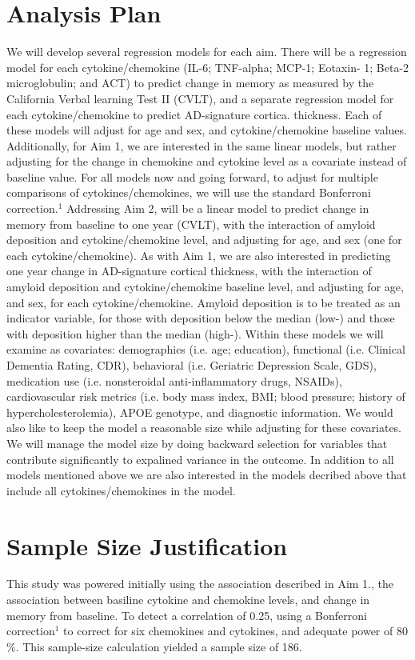 \documentclass[
]{article}
\begin{document}
\begin{doublespace}
\section{Analysis Plan}
We will develop several regression models for each aim. There will be a
regression model for each cytokine/chemokine (IL-6; TNF-alpha; MCP-1; Eotaxin-
1; Beta-2 microglobulin; and ACT) to predict change in memory as measured by the California Verbal learning Test II (CVLT),
and a separate regression model for each cytokine/chemokine to predict AD-signature cortica. thickness. Each of these
models will adjust for age and sex, and cytokine/chemokine baseline values.
Additionally, for Aim 1, we are
interested in the same linear models, but rather adjusting for the
change in chemokine and cytokine level as a covariate instead of
baseline value. For all models now and going forward, to adjust for multiple
comparisons of cytokines/chemokines, we will use the standard Bonferroni correction.\(^1\) Addressing Aim 2, will be a
linear model to predict change in memory from baseline to one year (CVLT),
with the interaction of amyloid deposition and cytokine/chemokine
level, and adjusting for age, and sex (one for each cytokine/chemokine). As with Aim 1,
we are also interested in predicting one year change in AD-signature cortical thickness,
with the interaction of amyloid deposition and cytokine/chemokine baseline
level, and adjusting for age, and sex, for each cytokine/chemokine. Amyloid deposition is to be
treated as an indicator variable, for those with deposition below the median (low-)
and those with deposition higher than the median (high-). Within these models we will examine as covariates:
demographics (i.e. age; education), functional (i.e. Clinical
Dementia Rating, CDR), behavioral (i.e. Geriatric
Depression Scale, GDS), medication use (i.e. nonsteroidal
anti-inflammatory drugs, NSAIDs),
cardiovascular risk metrics (i.e. body mass index,
BMI; blood pressure; history of
hypercholesterolemia), APOE genotype, and
diagnostic information. We would also
like to keep the model a reasonable size while adjusting for these covariates.
We will manage the model size by doing backward selection
for variables that contribute significantly to expalined variance in the outcome.
In addition to all models mentioned above we are also interested in the models decribed above that
include all cytokines/chemokines in the model.
\section{Sample Size Justification}
This study was powered initially using the association described in Aim
1., the association between basiline cytokine and chemokine levels, and
change in memory from baseline. To detect a correlation of 0.25, using a
Bonferroni correction\(^1\) to correct for six chemokines and
cytokines, and adequate power of \(80\)\%. This sample-size calculation
yielded a sample size of 186.


\end{doublespace}
\end{document}

